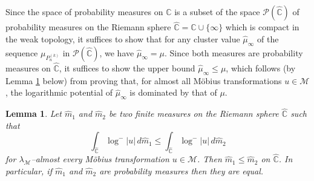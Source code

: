 \documentclass[12pt, reqno]{amsart}
\theoremstyle{plain}
\newtheorem{lemma}[theorem]{Lemma}
\theoremstyle{definition}
\newcommand\C{{\mathbb{C}}}
\begin{document}
 Since the space of probability measures on $\C$ is a subset of the space $\mathcal P(\hat \C)$ of probability measures on the Riemann sphere $\hat \C = \C\cup \{\infty\}$ which is compact in the weak topology, it suffices to show that for any cluster value $\widehat{\mu}_{\infty}$ of the sequence $\mu_{P_n^{(k)}}$ in $ \mathcal P(\hat \C)$, we have $\widehat{\mu}_{\infty} = \mu$. Since both measures are probability measures on $\widehat{\mathbb C}$, 
 it suffices to show the upper bound $\widehat{\mu}_{\infty} \le \mu$, 
 which follows (by Lemma \ref{lm:logpotential} below) from proving that, for almost all Möbius transformations 
 $u \in \mathcal M$, the logarithmic potential of $\widehat{\mu}_{\infty}$ is dominated by that of $\mu$.
 \begin{lemma}\cite[Lemma 2.7]{angst2024almost}\label{lm:logpotential}
 	Let $\widehat m_1$ and $\widehat m_2$ be two finite measures on 
 	the Riemann sphere $\widehat{\mathbb C}$ such that
 	\[
 	\int_{\widehat{\mathbb C}} \log^{-}|u|\, d\widehat m_1
 	\le
 	\int_{\widehat{\mathbb C}} \log^{-}|u|\, d\widehat m_2
 	\]
 	for $\lambda_{\mathcal M}$–almost every Möbius transformation 
 	$u \in \mathcal M$. 
 	Then $\widehat m_1 \le \widehat m_2$ on $\widehat{\mathbb C}$. In particular, if $\widehat m_1$ and $ \widehat m_2$ are probability measures then they are equal.
 \end{lemma}
 
\end{document}
